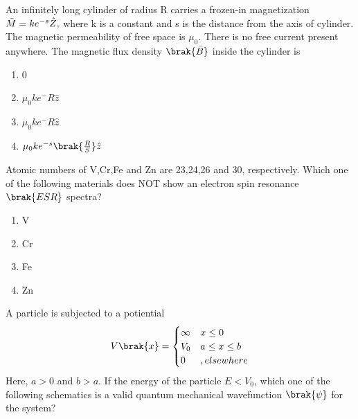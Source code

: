 \item An infinitely long cylinder of radius R carries a frozen-in magnetization $\Bar{M}=ke^{-s}\hat{Z},$ where k is a constant and s is the distance from the axis of cylinder. The magnetic permeability of free space is $\mu_{0}$. There is no free current present anywhere. The magnetic flux density $\brak{\Bar{B}}$ inside the cylinder is
\begin{enumerate}
    \item 0
    \item $\mu_0ke^-R\hat{z}$
    \item $\mu_0ke^-R\hat{z}$
    \item $\mu_0ke^{-s}\brak{\frac{R}{S}}\hat{z}$
\end{enumerate}
\item Atomic numbers of V,Cr,Fe and Zn are 23,24,26 and 30, respectively. Which one of the following materials does NOT show an electron spin resonance $\brak{ESR}$ spectra?
\begin{enumerate}
    \item V
    \item Cr
    \item Fe
    \item Zn
\end{enumerate}
\item A particle is subjected to a potiential 
\[
V\brak{x}=
\begin{cases}
\infty & x\leq 0\\
V_0 & a\leq x \leq b\\
0 & ,elsewhere\\
\end{cases}
\]
Here, $a>0$ and $b>a$. If the energy of the particle $E<V_0$, which one of the following schematics is a valid quantum mechanical wavefunction $\brak{\psi}$ for the system?
